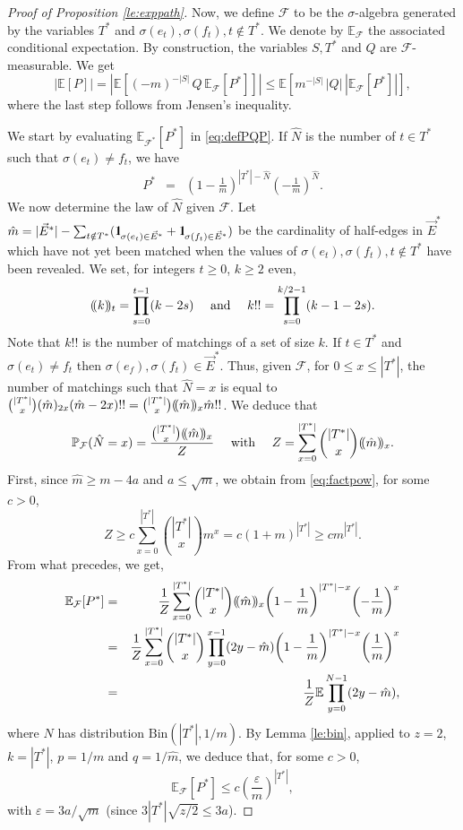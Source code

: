 \documentclass[11pt]{article}
\newcommand{\dE}{\mathbb {E}}
\newcommand{\dP}{\mathbb{P}}
\newcommand{\cF}{\mathcal {F}}
\newcommand{\Bin}{ \mathrm{Bin}}
\newcommand{\ABS}[1]{{{\left| #1 \right|}}} %
\newcommand{\SBRA}[1]{{{\left[#1\right]}}} %
\newcommand{\PAR}[1]{{{\left(#1\right)}}} %
\def\lp{(\hspace{-2pt}(}
\def\rp{)\hspace{-2pt})}
\newcommand{\1}{1\!\!{\sf I}}\newcommand{\IND}{\1}
\newcommand{\veps}{\varepsilon}
\newcommand{\si}{\sigma}
\begin{document}
\begin{proof}[Proof of Proposition \ref{le:exppath}]
Now, we define $\cF$ to be the $\sigma$-algebra generated by the variables $T^*$ and $\sigma(e_t), \sigma(f_t) , t \notin  T^*$. We denote by $\dE_{\cF}$ the associated conditional expectation. By construction, the variables $S,T^*$ and $Q$ are  $\cF$-measurable. We get
\begin{equation}\label{eq:defPQP}
\ABS{ \dE \SBRA{ P}} = \ABS{ \dE \SBRA{(-m)^{-|S|} \, Q  \, \dE_{\cF} \SBRA{P^*} }} \leq   \dE \SBRA{ m^{-|S|} \, |Q| \,  \ABS{ \dE_{\cF} \SBRA{P^*} }} , 
\end{equation}
where the last step follows from Jensen's inequality. 


We start by evaluating $ \dE_{\cF^*} \SBRA{P^*}$ in \eqref{eq:defPQP}. If $\hat N$ is the number of $t \in T^*$ such that $\sigma(e_t) \ne f_t$, we have 
\begin{eqnarray*}
 P^*   & =&  \PAR{ 1 - \frac 1 m}^{|T^* |  - \hat N} \PAR{ - \frac 1 m}^{\hat N}. 
\end{eqnarray*}
 We now determine the law of $\hat N$ given $\cF$. Let $\hat m = | \vec E^* | -   \sum_{t \notin T^*}( \IND_{ \si(e_t) \in \vec E^*} + \IND_{ \si(f_t) \in \vec E^* })$ be the cardinality of half-edges in $\vec E^*$ which have not yet been matched when  the values of $\sigma(e_t), \sigma(f_t) , t \notin  T^* $ have been revealed. We set, for  integers $ t \geq 0$, $k \geq 2$ even, 
$$
\lp k \rp_t = \prod_{s=0}^{t-1} (k - 2s) \quad \hbox{ and } \quad k!! = \prod_{s=0}^{k/2-1} (k -1 - 2s).
$$
Note that $k!!$ is the number of matchings of a set of size $k$. If $t \in T^*$ and $\sigma(e_t) \ne f_t$ then $\sigma(e_f), \sigma(f_t) \in \vec E^*$. Thus, given $\cF$, for $0 \leq x \leq |T^*|$, the number of matchings such that $\hat N = x$ is equal to ${|T^*| \choose x} (\hat m)_{2x} (\hat m-2x) !!  = {|T^*| \choose x} \lp \hat  m \rp_{  x} \hat m!!$. We deduce that
$$
\dP_{\cF} ( \hat N = x) = \frac{{|T^*| \choose x} \lp \hat  m \rp_{  x} }{Z}\quad \hbox{ with } \quad Z = \sum_{x = 0}^{|T^*|} {|T^*| \choose x} \lp \hat  m \rp_{x} . 
$$
First, since $\hat m \geq m - 4a$ and $a \leq  \sqrt{m}$, we obtain from \eqref{eq:factpow}, for some $c >0$, 
$$
Z \geq c \sum_{x = 0}^{|T^*|} {|T^*| \choose x}  m^{x}   = c ( 1+ m)^{|T^*|} \geq  c m^{|T^*|}. 
$$
From what precedes, we get, 
\begin{eqnarray*}
\dE_\cF \SBRA{P^*}  &=& \frac 1 Z \sum_{x = 0} ^{|T^*|} {|T^*| \choose x}  \lp \hat  m \rp_{x} \PAR{ 1 - \frac 1 m}^{|T^* |  - x} \PAR{ - \frac 1 m}^{x}\\
 & = &  \frac 1 Z \sum_{x = 0} ^{|T^*|} {|T^*| \choose x}  \prod_{y=0}^{x-1} ( 2y -  \hat m) \PAR{ 1 - \frac 1 m}^{|T^* |  - x} \PAR{ \frac 1 m}^{x} \\
& = &   \frac 1 Z \dE  \prod_{y=0}^{N-1} (2 y -  \hat m ),
\end{eqnarray*}
where $N$ has distribution $\Bin(|T^* | , 1 / m)$. By Lemma \ref{le:bin}, applied to $z = 2$,  $k =|T^* | $, $p = 1 / m$ and $q = 1 / \hat m $, we deduce that, for some $c >0$, 
\begin{equation}\label{eq:ddett}
\dE_\cF \SBRA{P^*} \leq c \PAR{ \frac{\veps}{m} }^{|T^*|} ,
\end{equation}
with $\veps =   3 a  / \sqrt m$ (since $3 |T^*| \sqrt{ z/2} \leq 3a$). 



\end{proof}
\end{document}
